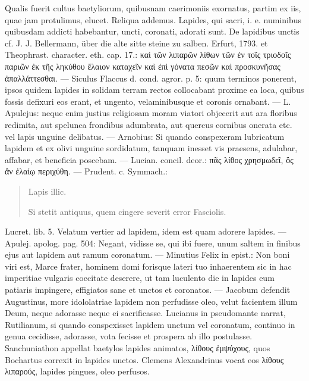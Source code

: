 \documentclass[a4paper, 11pt, oneside, polutonikogreek, german]{article}
\begin{document}
Qualis fuerit cultus baetyliorum, quibusnam caerimoniis exornatus, partim ex iis, quae jam protulimus, elucet. Reliqua addemus. Lapides, qui sacri, i. e. numinibus quibusdam addicti habebantur, uncti, coronati, adorati sunt. De lapidibus unctis cf. J. J. Bellermann, über die alte sitte steine zu salben. Erfurt, 1793. et Theophrast. character. eth. cap. 17.: καὶ τῶν λιπαρῶν λίθων τῶν ἐν τοῖς τριοδοῖς παριῶν ἐκ τῆς ληκύθου ἔλαιον καταχεῖν καὶ ἐπὶ γόνατα πεσῶν καὶ προσκυνῆσας ἀπαλλάττεσθαι. --- Siculus Flaccus d. cond. agror. p. 5: quum terminos ponerent, ipsos quidem lapides in solidam terram rectos collocabant proxime ea loca, quibus fossis defixuri eos erant, et ungento, velaminibusque et coronis ornabant. --- L. Apulejus: neque enim justius religiosam moram viatori objecerit aut ara floribus redimita, aut spelunca frondibus adumbrata, aut quercus cornibus onerata etc. vel lapis unguine delibatus. --- Arnobius: Si quando conspexeram lubricatum lapidem et ex olivi unguine sordidatum, tanquam inesset vis praesens, adulabar, affabar, et beneficia poscebam. --- Lucian. concil. deor.: πᾶς λίθος χρησμωδεῖ, ὃς ἂν ἐλαίῳ περιχύθη. --- Prudent. c. Symmach.:
\begin{quotation}
\hspace*{15mm}Lapis illic.

Si stetit antiquus, quem cingere severit error Fasciolis.
\end{quotation}
\hspace*{0mm}Lucret. lib. 5. Velatum vertier ad lapidem, idem est quam adorere lapides. --- Apulej. apolog. pag. 504: Negant, vidisse se, qui ibi fuere, unum saltem in finibus ejus aut lapidem aut ramum coronatum. --- Minutius Felix in epist.: Non boni viri est, Marce frater, hominem domi forisque lateri tuo inhaerentem sic in hac imperitiae vulgaris coecitate deserere, ut tam luculento die in lapides eum patiaris impingere, effigiatos sane et unctos et coronatos. --- Jacobum defendit Augustinus, more idololatriae lapidem non perfudisse oleo, velut facientem illum Deum, neque adorasse neque ei sacrificasse. Lucianus in pseudomante narrat, Rutilianum, si quando conspexisset lapidem unctum vel coronatum, continuo in genua cecidisse, adorasse, vota fecisse et prospera ab illo postulasse. Sanchuniathon appellat baetylos lapides animatos, λίθους ἐμψύχους, quos Bochartus correxit in lapides unctos. Clemens Alexandrinus vocat eos λίθους λιπαρούς, lapides pingues, oleo perfusos.
\end{document}
